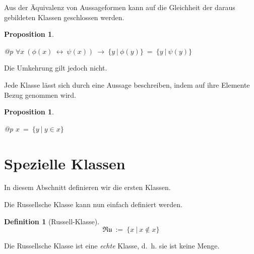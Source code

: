 \documentclass[a4paper,german,10pt,twoside]{book}
\newtheorem{prop}[thm]{Proposition}
\theoremstyle{definition}
\newtheorem{defn}[thm]{Definition}
\theoremstyle{remark}
\begin{document}
\par
Aus der {\"A}quivalenz von Aussageformen kann auf die Gleichheit der daraus gebildeten Klassen geschlossen werden.

\begin{prop}
\label{theorem:propositionEqualImplClassEqual} \hypertarget{theorem:propositionEqualImplClassEqual}{}
\mbox{}
\begin{longtable}{{@{\extracolsep{\fill}}p{\linewidth}}}
\centering $\forall x\ (\phi(x)\ \leftrightarrow \ \psi(x))\ \rightarrow \ \{ y \ | \ \phi(y) \}  \ =  \ \{ y \ | \ \psi(y) \} $
\end{longtable}

\end{prop}

Die Umkehrung gilt jedoch nicht.


\par
Jede Klasse l{\"a}sst sich durch eine Aussage beschreiben, indem auf ihre Elemente Bezug genommen wird.

\begin{prop}
\label{theorem:classDescriptionPossible} \hypertarget{theorem:classDescriptionPossible}{}
\mbox{}
\begin{longtable}{{@{\extracolsep{\fill}}p{\linewidth}}}
\centering $x \ =  \ \{ y \ | \ y \in x \} $
\end{longtable}

\end{prop}




\section{Spezielle Klassen} \label{chapter2_section1} \hypertarget{chapter2_section1}{}
In diesem Abschnitt definieren wir die ersten Klassen.

\par
Die Russellsche Klasse kann nun einfach definiert werden.

\begin{defn}[Russell-Klasse]
\label{definition:RussellClass} \hypertarget{definition:RussellClass}{}
$$\mathfrak{Ru}\ := \ \{ x \ | \ x \notin x \} $$

\end{defn}




\par
Die Russellsche Klasse ist eine \emph{echte} Klasse, d.~h. sie ist keine Menge.
\end{document}

